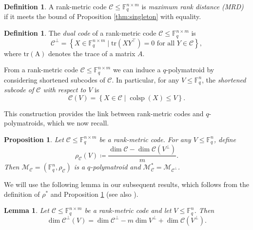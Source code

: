 \documentclass[onecolumn,draftclsnofoot,12pt]{IEEEtran}
\newcommand{\C}{\mathcal{C}}
\theoremstyle{plain} %
\newtheorem{lemma}[theorem]{Lemma}
\newtheorem{proposition}[theorem]{Proposition}
\theoremstyle{definition}
\newtheorem{definition}[theorem]{Definition}
\begin{document}
\begin{definition}
    A rank-metric code $\mathcal{C} \leq \mathbb{F}_q^{n \times m}$ is \emph{maximum rank distance (MRD)} if it meets the bound of Proposition \ref{thm:singleton} with equality.
\end{definition}

\begin{definition}
    The \textit{dual code} of a rank-metric code $\mathcal{C} \leq \mathbb{F}_q^{n \times m}$ is
    $$
    \mathcal{C}^\perp = \left\{ X \in \mathbb{F}_q^{n \times m} \mid \mathrm{tr}(X Y^\top) = 0 \text{ for all } Y \in \mathcal{C} \right\},$$
    where $\mathrm{tr(A)}$ denotes the trace of a matrix $A$.
\end{definition}

From a rank-metric code $\mathcal{C} \leq \mathbb{F}_q^{n \times m}$ we can induce a $q$-polymatroid by considering shortened subcodes of $\mathcal{C}$. 
In particular, for any $V\leq \mathbb{F}_q^n$, the \emph{shortened subcode of 
$\mathcal{C}$ with respect to $V$} is
\[
\mathcal{C}(V) = \left\{ X \in \mathcal{C} \mid \operatorname{colsp}(X) \leq V \right\}.
\]



This construction provides the link between rank-metric codes and $q$-polymatroids, which we now recall.

\begin{proposition}\label{prop:dualpoly}
    Let $\mathcal{C} \leq \mathbb{F}_q^{n \times m}$ be a rank-metric code. For any $V \leq \mathbb{F}_q^n$, define
    \[
    \rho_{\mathcal{C}}(V) \coloneqq \frac{\dim \mathcal{C} - \dim \mathcal{C}(V^\perp)}{m}.
    \]
    Then $\mathcal{M}_{\mathcal{C}} = (\mathbb{F}_q^n, \rho_{\mathcal{C}})$ is a $q$-polymatroid and $\mathcal{M}^*_{\mathcal{C}} = \mathcal{M}_{\mathcal{C}^\perp}$.
\end{proposition}

We will use the following lemma in our subsequent results, which follows from the definition of $\rho^*$ and Proposition \ref{prop:dualpoly} (see also \cite{bbds_2018,rav_2016}). 

\begin{lemma}\label{lem:ccdual}
Let $\mathcal{C} \leq \mathbb{F}_q^{n \times m}$ be a rank-metric code and let $V \leq \mathbb{F}_q^n$.
Then $$\dim \C^\perp(V) = \dim \C^\perp-m\dim V^\perp +\dim \C(V^\perp).$$
\end{lemma}

\end{document}
